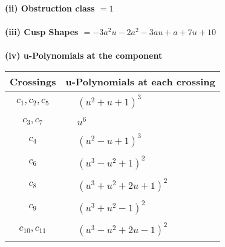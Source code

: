 \documentclass[1p]{elsarticle_modified}
\theoremstyle{definition}
\begin{document}
\flushleft \textbf{(ii) Obstruction class $= 1$}\\~\\
\flushleft \textbf{(iii) Cusp Shapes $= -3 a^2 u-2 a^2-3 a u+a+7 u+10$}\\~\\
\newpage\renewcommand{\arraystretch}{1}
\flushleft \textbf{(iv) u-Polynomials at the component}\newline \\
\begin{tabular}{m{50pt}|m{274pt}}
Crossings & \hspace{64pt}u-Polynomials at each crossing \\
\hline $$\begin{aligned}c_{1},c_{2},c_{5}\end{aligned}$$&$\begin{aligned}
&(u^2+u+1)^3
\end{aligned}$\\
\hline $$\begin{aligned}c_{3},c_{7}\end{aligned}$$&$\begin{aligned}
&u^6
\end{aligned}$\\
\hline $$\begin{aligned}c_{4}\end{aligned}$$&$\begin{aligned}
&(u^2- u+1)^3
\end{aligned}$\\
\hline $$\begin{aligned}c_{6}\end{aligned}$$&$\begin{aligned}
&(u^3- u^2+1)^2
\end{aligned}$\\
\hline $$\begin{aligned}c_{8}\end{aligned}$$&$\begin{aligned}
&(u^3+u^2+2 u+1)^2
\end{aligned}$\\
\hline $$\begin{aligned}c_{9}\end{aligned}$$&$\begin{aligned}
&(u^3+u^2-1)^2
\end{aligned}$\\
\hline $$\begin{aligned}c_{10},c_{11}\end{aligned}$$&$\begin{aligned}
&(u^3- u^2+2 u-1)^2
\end{aligned}$\\
\hline
\end{tabular}\\~\\
\end{document}
